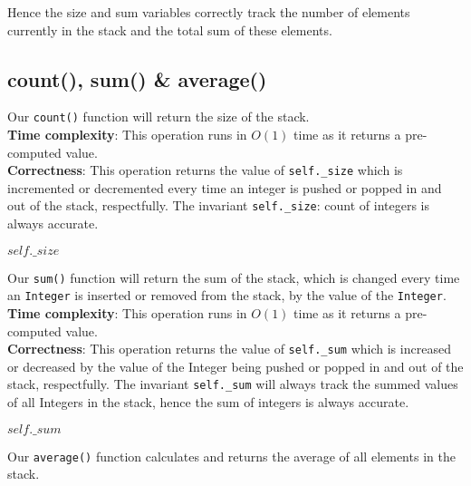 \documentclass[12pt]{article}
\begin{document}
Hence the size and sum variables correctly track the number of elements currently in the stack and the total sum of these elements.

\subsection*{count(), sum() \& average()} 

Our \texttt{count()} function will return the size of the stack. \\

\textbf{Time complexity}: This operation runs in $O(1)$ time as it returns a pre-computed value.\\

\textbf{Correctness}: This operation returns the value of \texttt{self.\_size} which is incremented or decremented every time an integer is pushed or popped in and out of the stack, respectfully. The invariant \texttt{self.\_size}: count of integers is always accurate.\\

\begin{algorithmic}[1]
    \State \Return $self.\_size$
\EndFunction
\end{algorithmic}
\vspace{5mm}

Our \texttt{sum()} function will return the sum of the stack, which is changed every time an \texttt{Integer} is inserted or removed from the stack, by the value of the \texttt{Integer}. \\

\textbf{Time complexity}: This operation runs in $O(1)$ time as it returns a pre-computed value.\\

\textbf{Correctness}: This operation returns the value of \texttt{self.\_sum} which is increased or decreased by the value of the Integer being pushed or popped in and out of the stack, respectfully. The invariant \texttt{self.\_sum} will always track the summed values of all Integers in the stack, hence the sum of integers is always accurate.\\

\begin{algorithmic}[1]
    \State \Return $self.\_sum$
\EndFunction
\end{algorithmic}
\vspace{5mm}

Our \texttt{average()} function calculates and returns the average of all elements in the stack. \\
\end{document}
